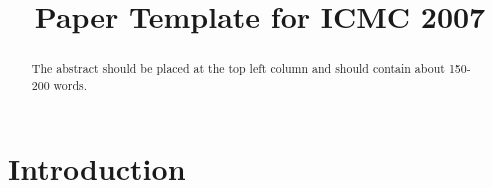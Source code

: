 \documentclass{article}
\title{Paper Template for ICMC 2007}
\begin{document}
\maketitle

\begin{abstract}
The abstract should be placed at the top left column and should contain
about 150-200 words.
\end{abstract}

\section{Introduction}
\label{sec:introduction}

%
%
\end{document}
